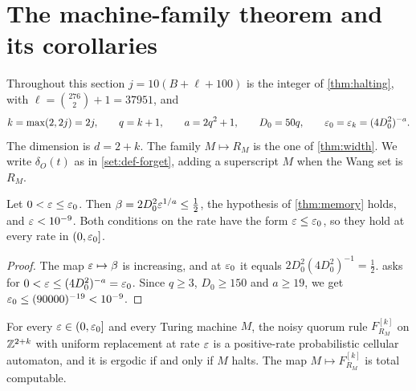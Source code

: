 \section{The machine-family theorem and its corollaries}\label{sec:proofs}

Throughout this section $j=10(B+\ell+100)$ is the integer of \cref{thm:halting}, with $\ell=\binom{276}{2}+1=37951$, and
\[
k=\max(2,2j)=2j,\qquad q=k+1,\qquad a=2q^2+1,\qquad D_0=50q,\qquad \varepsilon_0=\varepsilon_k=(4D_0^2)^{-a}.
\]
The dimension is $d=2+k$. The family $M\mapsto R_M$ is the one of \cref{thm:width}. We write $\delta_O(t)$ as in \cref{set:def-forget}, adding a superscript $M$ when the Wang set is $R_M$.

\begin{lemma}\label{pf:threshold}
Let $0<\varepsilon\le\varepsilon_0$. Then $\beta=2D_0^2\varepsilon^{1/a}\le\frac12$, the hypothesis of \cref{thm:memory} holds, and $\varepsilon<10^{-9}$. Both conditions on the rate have the form $\varepsilon\le\varepsilon_0$, so they hold at every rate in $(0,\varepsilon_0]$.
\end{lemma}

\begin{proof}
The map $\varepsilon\mapsto\beta$ is increasing, and at $\varepsilon_0$ it equals $2D_0^2(4D_0^2)^{-1}=\frac12$.  asks for $0<\varepsilon\le(4D_0^2)^{-a}=\varepsilon_0$. Since $q\ge3$, $D_0\ge150$ and $a\ge19$, we get $\varepsilon_0\le(90000)^{-19}<10^{-9}$.
\end{proof}

\begin{theorem}\label{thm:main}
For every $\varepsilon\in(0,\varepsilon_0]$ and every Turing machine $M$, the noisy quorum rule $F^{[k]}_{R_M}$ on $\mathbb{Z}^{2+k}$ with uniform replacement at rate $\varepsilon$ is a positive-rate probabilistic cellular automaton, and it is ergodic if and only if $M$ halts. The map $M\mapsto F^{[k]}_{R_M}$ is total computable.
\end{theorem}

